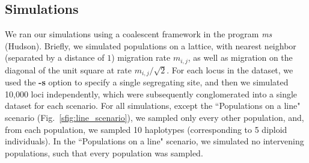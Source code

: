 \documentclass[12pt]{article}
\newcommand{\identifyadmixsource}[1]{{#1^{*}}}
\begin{document}




\subsection*{Simulations}
We ran our simulations using a coalescent framework in the program \textit{ms} (Hudson).  Briefly, we simulated populations on a lattice, with nearest neighbor (separated by a distance of $1$) migration rate $m_{i,j}$, as well as migration on the diagonal of the unit square at rate $m_{i,j}/\sqrt{2}$.  For each locus in the dataset, we used the \textbf{-s} option to specify a single segregating site, and then we simulated 10,000 loci independently, which were subsequently conglomerated into a single dataset for each scenario.  For all simulations, except the ``Populations on a line" scenario (Fig.\ \ref{sfig:line_scenario}), we sampled only every other population, and, from each population, we sampled 10 haplotypes (corresponding to 5 diploid individuals).  In the ``Populations on a line" scenario, we simulated no intervening populations, such that every population was sampled.
\end{document}
